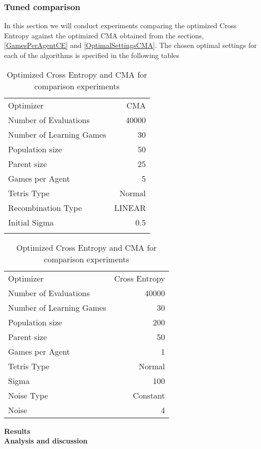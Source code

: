 \subsubsection{Tuned comparison \label{tunedComparison}}
In this section we will conduct experiments comparing the optimized Cross Entropy against the
optimized CMA obtained from the sections, \ref{GamesPerAgentCE} and \ref{OptimalSettingsCMA}.
The chosen optimal settings for each of the algorithms is specified in the following tables
\begin{table}[h]
\centering
\begin{tabular}{l r}
Optimizer & CMA\\
Number of Evaluations & 40000\\
Number of Learning Games & 30\\
Population size& 50\\
Parent size & 25\\
Games per Agent & 5\\
Tetris Type & Normal\\
\hline
Recombination Type & LINEAR\\
Initial Sigma & 0.5\\
 & \\
\end{tabular}
\quad
\begin{tabular}{l r}
Optimizer & Cross Entropy\\
Number of Evaluations & 40000\\
Number of Learning Games & 30\\
Population size & 200\\
Parent size & 50\\
Games per Agent & 1\\
Tetris Type & Normal\\
\hline
Sigma & 100\\
Noise Type & Constant\\
Noise & 4
\end{tabular}
\caption{Optimized Cross Entropy and CMA for comparison experiments}
\end{table}

\textbf{Results}\\


\textbf{Analysis and discussion}\\

